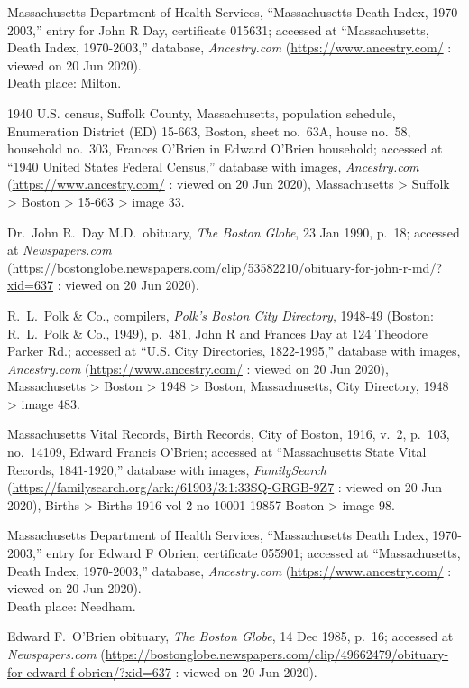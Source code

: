 \begin{thebibliography}{999}
	Massachusetts Department of Health Services, ``Massachusetts Death Index, 1970-2003,'' entry for John R Day, certificate 015631; accessed at ``Massachusetts, Death Index, 1970-2003,'' database, \textit{Ancestry.com} (\url{https://www.ancestry.com/} : viewed on 20 Jun 2020).\\
	Death place: Milton.
	
	1940 U.S. census, Suffolk County, Massachusetts, population schedule, Enumeration District (ED) 15-663, Boston, sheet no.\ 63A, house no.\ 58, household no.\ 303, Frances O'Brien in Edward O'Brien household; accessed at ``1940 United States Federal Census,'' database with images, \textit{Ancestry.com} (\url{https://www.ancestry.com/} : viewed on 20 Jun 2020), Massachusetts > Suffolk > Boston > 15-663 > image 33.
	
	Dr.\ John R.\ Day M.D.\ obituary, \textit{The Boston Globe}, 23 Jan 1990, p.\ 18; accessed at \textit{Newspapers.com} (\url{https://bostonglobe.newspapers.com/clip/53582210/obituary-for-john-r-md/?xid=637} : viewed on 20 Jun 2020).
	
	R.\ L.\ Polk \& Co., compilers, \textit{Polk's Boston City Directory}, 1948-49 (Boston: R.\ L.\ Polk \& Co., 1949), p.\ 481, John R and Frances Day at 124 Theodore Parker Rd.; accessed at ``U.S. City Directories, 1822-1995,'' database with images, \textit{Ancestry.com} (\url{https://www.ancestry.com/} : viewed on 20 Jun 2020), Massachusetts > Boston > 1948 > Boston, Massachusetts, City Directory, 1948 > image 483.
	
	Massachusetts Vital Records, Birth Records, City of Boston, 1916, v.\ 2, p.\ 103, no.\ 14109, Edward Francis O'Brien; accessed at ``Massachusetts State Vital Records, 1841-1920,'' database with images, \textit{FamilySearch} (\url{https://familysearch.org/ark:/61903/3:1:33SQ-GRGB-9Z7} : viewed on 20 Jun 2020), Births > Births 1916 vol 2 no 10001-19857 Boston > image 98.
	
	Massachusetts Department of Health Services, ``Massachusetts Death Index, 1970-2003,'' entry for Edward F Obrien, certificate 055901; accessed at ``Massachusetts, Death Index, 1970-2003,'' database, \textit{Ancestry.com} (\url{https://www.ancestry.com/} : viewed on 20 Jun 2020).\\
	Death place: Needham.
	
	Edward F.\ O'Brien obituary, \textit{The Boston Globe}, 14 Dec 1985, p.\ 16; accessed at \textit{Newspapers.com} (\url{https://bostonglobe.newspapers.com/clip/49662479/obituary-for-edward-f-obrien/?xid=637} : viewed on 20 Jun 2020).
	

\end{thebibliography}
